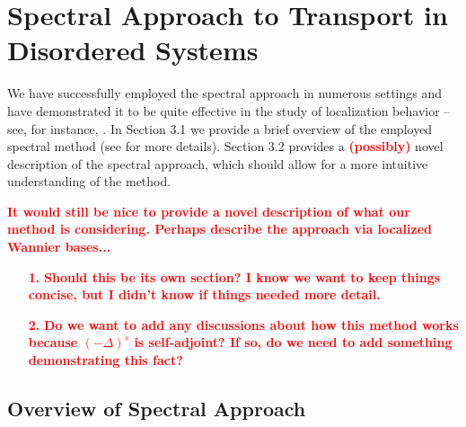\documentclass[final,1p,times]{elsarticle}
\newcommand{\no}{\noindent}
\theoremstyle{remark}
\theoremstyle{definition}
\newcommand{\josh}[1]{\textcolor{red}{\textbf{#1}}}
\begin{document}



\section{Spectral Approach to Transport in Disordered Systems}

We have successfully employed the spectral approach in numerous settings and have demonstrated it to be quite effective in the study of localization behavior -- see, for instance, \cite{Liaw2013,1751-8121-47-30-305202,
2053-1591-3-12-125904,PhysRevB.96.235408,kostadinova2018transport}. In Section 3.1 we provide a brief overview of the employed spectral method (see \cite{Liaw2013} for more details). Section 3.2 provides a \josh{(possibly)} novel description of the spectral approach, which should allow for a more intuitive understanding of the method.

\vspace{3mm}

\no\josh{It would still be nice to provide a novel description of what our method is considering. Perhaps describe the approach via localized Wannier bases...}

\begin{itemize}
\item[\josh{1.}] \josh{Should this be its own section? I know we want to keep things concise, but I didn't know if things needed more detail.}

\item[\josh{2.}] \josh{Do we want to add any discussions about how this method works because $(-\Delta)^s$ is self-adjoint? If so, do we need to add something demonstrating this fact?}
\end{itemize}

\subsection{Overview of Spectral Approach}
\end{document}
